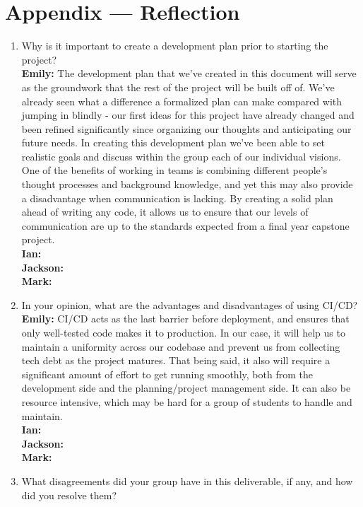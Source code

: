 \documentclass{article}
\begin{document}
\newpage{}

\section*{Appendix --- Reflection}



\begin{enumerate}
    \item Why is it important to create a development plan prior to starting the
    project?\\
    \textbf{Emily:} The development plan that we’ve created in this document will serve as the groundwork that the rest of the project will be built off of. 
                    We’ve already seen what a difference a formalized plan can make compared with jumping in blindly - our first ideas for this project have 
                    already changed and been refined significantly since organizing our thoughts and anticipating our future needs. In creating this development 
                    plan we’ve been able to set realistic goals and discuss within the group each of our individual visions. One of the benefits of working in 
                    teams is combining different people’s thought processes and background knowledge, and yet this may also provide a disadvantage when communication 
                    is lacking. By creating a solid plan ahead of writing any code, it allows us to ensure that our levels of communication are up to the standards 
                    expected from a final year capstone project. \\
    \textbf{Ian:} \\
    \textbf{Jackson:} \\
    \textbf{Mark:} \\

    \item In your opinion, what are the advantages and disadvantages of using
    CI/CD?\\
    \textbf{Emily:} CI/CD acts as the last barrier before deployment, and ensures that only well-tested code makes it to production. In our case, it will help 
                    us to maintain a uniformity across our codebase and prevent us from collecting tech debt as the project matures. That being said, it also will 
                    require a significant amount of effort to get running smoothly, both from the development side and the planning/project management side. It 
                    can also be resource intensive, which may be hard for a group of students to handle and maintain.  \\
    \textbf{Ian:} \\
    \textbf{Jackson:} \\
    \textbf{Mark:} \\
    
    \item What disagreements did your group have in this deliverable, if any,
    and how did you resolve them?
\end{enumerate}
\end{document}
